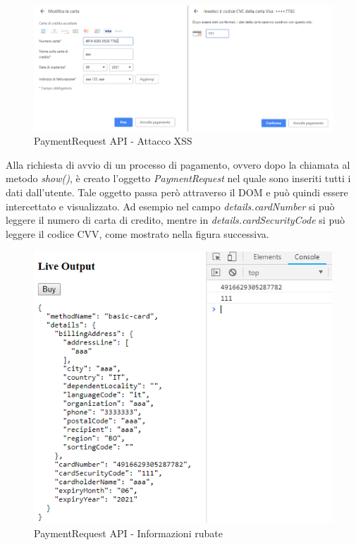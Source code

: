 \documentclass[12pt ,a4paper , twoside , openright ]{book}
\begin{document}
	\begin{figure}[h]
		\centering
		\includegraphics[width=\linewidth]{AttaccoXSS}
		\caption{PaymentRequest API - Attacco XSS\cite{rif30}}
		\label{fig: PaymentRequest API - Attacco XSS}
	\end{figure} 
	\newpage
	Alla richiesta di avvio di un processo di pagamento, ovvero dopo la chiamata al metodo \textit{show()}, è creato l'oggetto \textit{PaymentRequest} nel quale sono inseriti tutti i dati dall'utente. Tale oggetto passa però attraverso il DOM e può quindi essere intercettato e visualizzato. Ad esempio nel campo \textit{details.cardNumber} si può leggere il numero di carta di credito, mentre in \textit{details.cardSecurityCode} si può leggere il codice CVV, come mostrato nella figura successiva.
	\begin{figure}[h]
		\centering
		\includegraphics[width=0.8\linewidth]{Informazioni}
		\caption{PaymentRequest API - Informazioni rubate}
		\label{fig: PaymentRequest API - Informazioni rubate}
	\end{figure} 
\end{document}

